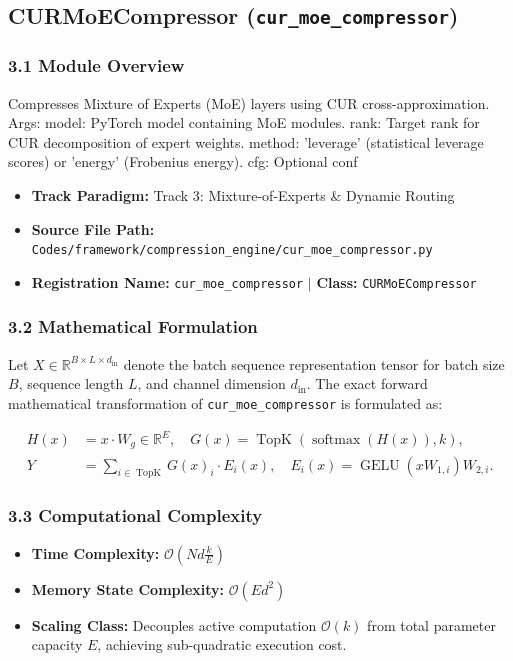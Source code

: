 \subsection{CURMoECompressor (\texttt{cur\_moe\_compressor})}
\label{sec:app_module_cur_moe_compressor}

\subsubsection*{3.1 Module Overview}
Compresses Mixture of Experts (MoE) layers using CUR cross-approximation.  Args:     model: PyTorch model containing MoE modules.     rank: Target rank for CUR decomposition of expert weights.     method: 'leverage' (statistical leverage scores) or 'energy' (Frobenius energy).     cfg: Optional conf
\begin{itemize}
    \item \textbf{Track Paradigm:} Track 3: Mixture-of-Experts & Dynamic Routing
    \item \textbf{Source File Path:} \texttt{Codes/framework/compression\_engine/cur\_moe\_compressor.py}
    \item \textbf{Registration Name:} \texttt{cur\_moe\_compressor} $\mid$ \textbf{Class:} \texttt{CURMoECompressor}
\end{itemize}

\subsubsection*{3.2 Mathematical Formulation}
Let $X \in \mathbb{R}^{B \times L \times d_{\text{in}}}$ denote the batch sequence representation tensor for batch size $B$, sequence length $L$, and channel dimension $d_{\text{in}}$. The exact forward mathematical transformation of \texttt{cur\_moe\_compressor} is formulated as:

\begin{align}
H(x) &= x \cdot W_g \in \mathbb{R}^{E}, \quad G(x) = \operatorname{TopK}\left(\operatorname{softmax}(H(x)), k\right), \\
Y &= \sum_{i \in \operatorname{TopK}} G(x)_i \cdot E_i(x), \quad E_i(x) = \operatorname{GELU}(x W_{1, i}) W_{2, i}.
\end{align}


\subsubsection*{3.3 Computational Complexity}
\begin{itemize}
    \item \textbf{Time Complexity:} $\mathcal{O}(N d \frac{k}{E})$
    \item \textbf{Memory State Complexity:} $\mathcal{O}(E d^2)$
    \item \textbf{Scaling Class:} Decouples active computation $\mathcal{O}(k)$ from total parameter capacity $E$, achieving sub-quadratic execution cost.
\end{itemize}

